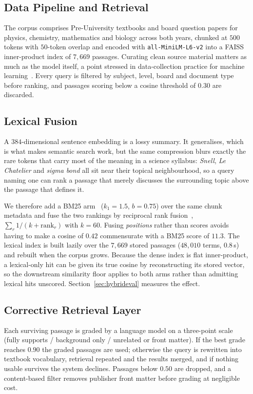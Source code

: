 \documentclass[conference]{IEEEtran}
\begin{document}
\subsection{Data Pipeline and Retrieval}
The corpus comprises Pre-University textbooks and board question papers for
physics, chemistry, mathematics and biology across both years, chunked at $500$
tokens with $50$-token overlap and encoded with
\texttt{all-MiniLM-L6-v2} into a FAISS inner-product index of
$7{,}669$ passages. Curating clean source material matters as much as the model
itself, a point stressed in data-collection practice for machine
learning~\cite{roh2021}. Every query is filtered by subject, level, board and
document type before ranking, and passages scoring below a cosine threshold of
$0.30$ are discarded.

\subsection{Lexical Fusion}
\label{sec:hybrid}
A $384$-dimensional sentence embedding is a lossy summary. It generalises, which
is what makes semantic search work, but the same compression blurs exactly the
rare tokens that carry most of the meaning in a science syllabus: \emph{Snell},
\emph{Le Chatelier} and \emph{sigma bond} all sit near their topical
neighbourhood, so a query naming one can rank a passage that merely discusses
the surrounding topic above the passage that defines it.

We therefore add a BM25 arm~\cite{robertson2009} ($k_1=1.5$, $b=0.75$) over the
same chunk metadata and fuse the two rankings by reciprocal rank
fusion~\cite{cormack2009}, $\sum_r 1/(k + \text{rank}_r)$ with $k=60$. Fusing \emph{positions} rather than scores avoids having to make a
cosine of $0.42$ commensurate with a BM25 score of $11.3$. The lexical index is
built lazily over the $7{,}669$ stored passages ($48{,}010$ terms, $0.8$\,s) and
rebuilt when the corpus grows. Because the dense index is flat inner-product,
a lexical-only hit can be given its true cosine by reconstructing its stored
vector, so the downstream similarity floor applies to both arms rather than
admitting lexical hits unscored. Section~\ref{sec:hybrideval} measures the
effect.

\subsection{Corrective Retrieval Layer}
\label{sec:crag}
Each surviving passage is graded by a language model on a three-point scale
(fully supports / background only / unrelated or front matter). If the best
grade reaches $0.90$ the graded passages are used; otherwise the query is
rewritten into textbook vocabulary, retrieval repeated and the results merged,
and if nothing usable survives the system declines. Passages below $0.50$ are
dropped, and a content-based filter removes publisher front matter before
grading at negligible cost.
\end{document}
